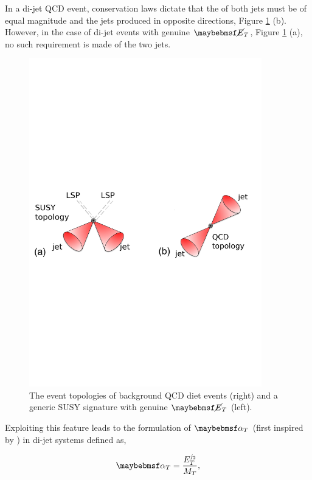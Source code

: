 In a di-jet QCD event, conservation laws dictate that the \pt of both jets must be of equal magnitude and the jets produced in opposite directions, Figure \ref{fig:susytopology} (b). However, in the case of di-jet events with genuine $\met$, Figure \ref{fig:susytopology} (a), no such requirement is made of the two jets. 
\begin{figure}[!h]
\centering
\includegraphics[width=0.90\textwidth]{plots/susy_topology_v3.pdf}
\caption[The event topologies of background QCD diet events (a) and a generic \ac{SUSY} signature with genuine $\met$ (b).]{The event topologies of background QCD diet events (right) and a generic \ac{SUSY} signature with genuine $\met$ (left).}  
\label{fig:susytopology}
\end{figure}

 Exploiting this feature leads to the formulation of $\alphat$ (first inspired by \cite{PhysRevLett.101.221803}) in di-jet systems defined as,

\begin{equation}
\alphat = \frac {E^{j_{2}}_{T}}{M_{T}},
\end{equation} 

